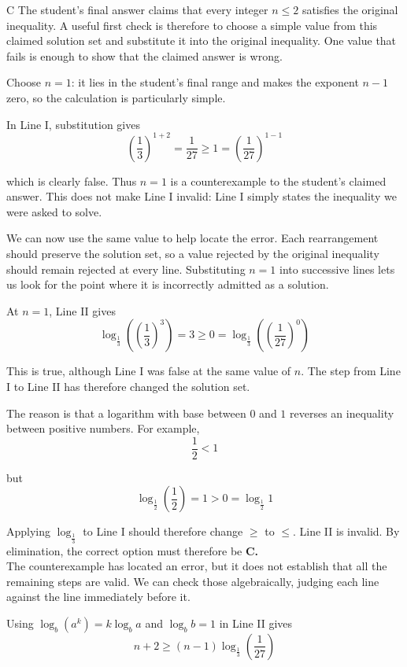 \documentclass[11pt,a4paper]{article}
\begin{document}
\begin{enumerate}[label=\textbf{\arabic*.},leftmargin=*,itemsep=0pt,start=8]
\begin{djsSolution}{C}
The student's final answer claims that every integer $n\le2$ satisfies the original inequality. A useful first check is therefore to choose a simple value from this claimed solution set and substitute it into the original inequality. One value that fails is enough to show that the claimed answer is wrong.

Choose $n=1$: it lies in the student's final range and makes the exponent $n-1$ zero, so the calculation is particularly simple.

In Line I, substitution gives
\[
\left(\frac13\right)^{1+2}=\frac1{27}\geq1=\left(\frac1{27}\right)^{1-1}
\]

which is clearly false.
Thus $n=1$ is a counterexample to the student's claimed answer. This does not make Line I invalid: Line I simply states the inequality we were asked to solve.

We can now use the same value to help locate the error. Each rearrangement should preserve the solution set, so a value rejected by the original inequality should remain rejected at every line. Substituting $n=1$ into successive lines lets us look for the point where it is incorrectly admitted as a solution.

At $n=1$, Line II gives
\[
\log_{\frac13}\left(\left(\frac13\right)^3\right)=3\ge0=\log_{\frac13}\left(\left(\frac1{27}\right)^0\right)
\]

This is true, although Line I was false at the same value of $n$. The step from Line I to Line II has therefore changed the solution set.

The reason is that a logarithm with base between $0$ and $1$ reverses an inequality between positive numbers. For example,
\[
\frac12<1
\]

but
\[
\log_{\frac12}\left(\frac12\right)=1>0=\log_{\frac12}1
\]

Applying $\log_{\frac13}$ to Line I should therefore change $\ge$ to $\le$. Line II is invalid. By elimination, the correct option must therefore be \textbf{C.} \\

The counterexample has located an error, but it does not establish that all the remaining steps are valid. We can check those algebraically, judging each line against the line immediately before it.

Using $\log_b(a^k)=k\log_b a$ and $\log_b b=1$ in Line II gives
\[
n+2\ge(n-1)\log_{\frac13}\left(\frac1{27}\right)
\]


\end{djsSolution}
\end{enumerate}
\end{document}
